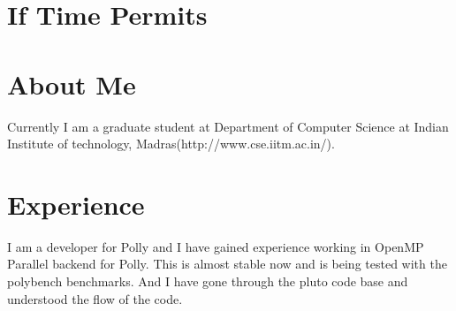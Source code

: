 \documentclass[a4paper,12pt]{article}
\begin{document}
\section{If Time Permits}

\section{About Me}

Currently I am a graduate student at Department of Computer Science at
Indian Institute of technology, Madras(http://www.cse.iitm.ac.in/).

\section{Experience}

I am a developer for Polly and I have gained experience working in OpenMP
Parallel backend for Polly. This is almost stable now and is being tested
with the polybench benchmarks. And I have gone through the pluto code base
and understood the flow of the code.
\end{document}
